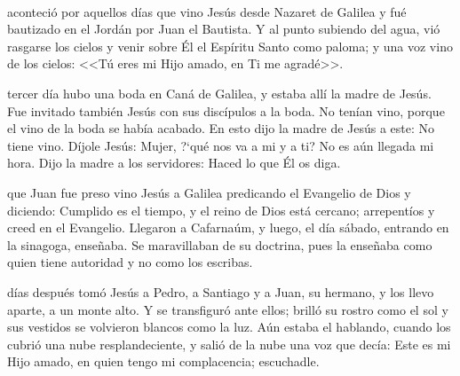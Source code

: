 \documentclass[10pt,twoside]{book}
\begin{document}
\\[4mm]
\space aconteció por aquellos días que vino Jesús desde Nazaret de Galilea y fué bautizado en el Jordán por Juan el Bautista.
Y al punto subiendo del agua, vió rasgarse los cielos y venir sobre Él el Espíritu Santo como paloma; y una voz vino de los cielos: 
<<Tú eres mi Hijo amado, en Ti me agradé>>.\\[-2mm]

\vspace{5mm}

\vspace{2mm}
tercer día hubo una boda en Caná de Galilea, y estaba allí la madre de Jesús. Fue invitado también Jesús con sus discípulos a la boda.
No tenían vino, porque el vino de la boda se había acabado. En esto dijo la madre de Jesús a este: No tiene vino. Díjole Jesús: Mujer,
{?`}qué nos va a mi y a ti? No es aún llegada mi hora. Dijo la madre a los servidores: Haced lo que Él os diga.\\[2mm]

\vspace{5mm}

\vspace{2mm}
que Juan fue preso vino Jesús a Galilea predicando el Evangelio de Dios y diciendo: Cumplido es el tiempo, y el reino de Dios está cercano;
arrepentíos y creed en el Evangelio. Llegaron a Cafarnaúm, y luego, el día sábado, entrando en la sinagoga, enseñaba. Se maravillaban de su doctrina,
pues la enseñaba como quien tiene autoridad y no como los escribas.\\[2mm]

\vspace{5mm}

\vspace{2mm}
días después tomó Jesús a Pedro, a Santiago y a Juan, su hermano, y los llevo aparte, a un monte alto. Y se transfiguró ante ellos;
brilló su rostro como el sol y sus vestidos se volvieron blancos como la luz. Aún estaba el hablando, cuando los cubrió una nube resplandeciente,
y salió de la nube una voz que decía: Este es mi Hijo amado, en quien tengo mi complacencia; escuchadle.\\[2mm]

\vspace{5mm}
\end{document}
